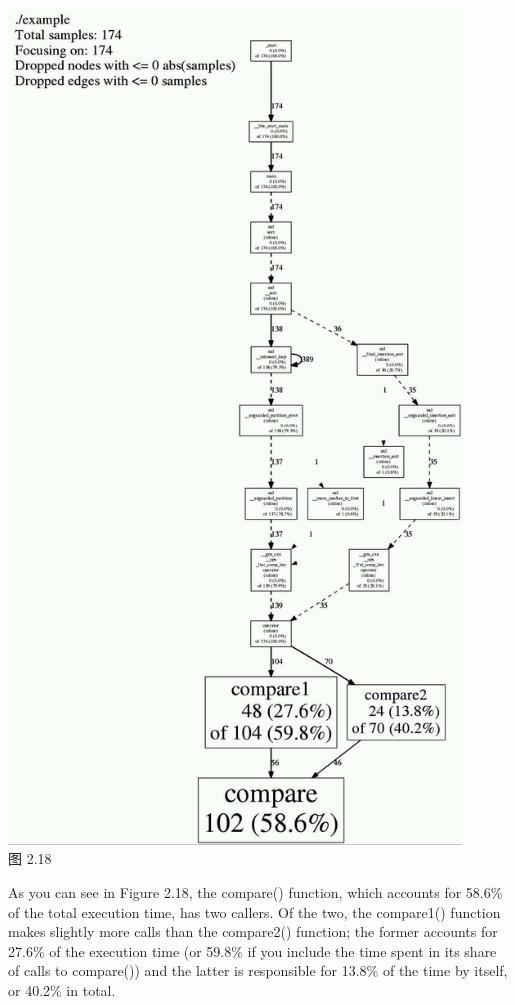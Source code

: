 \begin{center}
\includegraphics[width=0.9\textwidth]{content/1/chapter2/images/18.jpg}\\
图 2.18
\end{center}

As you can see in Figure 2.18, the compare() function, which accounts for 58.6\% of the total execution time, has two callers. Of the two, the compare1() function makes slightly more calls than the compare2() function; the former accounts for 27.6\% of the execution time (or 59.8\% if you include the time spent in its share of calls to compare()) and the latter is responsible for 13.8\% of the time by itself, or 40.2\% in total.

